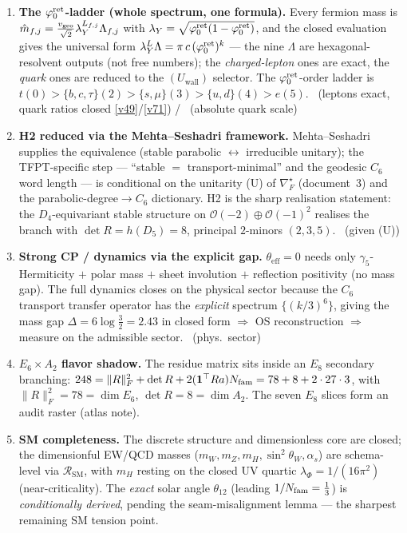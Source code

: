 \begin{enumerate}[leftmargin=1.5em]
\item \textbf{The $\varphi_0^{\mathrm{ret}}$-ladder (whole spectrum, one formula).} Every fermion mass is
  $\hat m_{f,j}=\tfrac{v_{\mathrm{geo}}}{\sqrt2}\lambda_Y^{L_{f,j}}\Lambda_{f,j}$ with
  $\lambda_Y=\sqrt{\varphi_0^{\mathrm{ret}}(1-\varphi_0^{\mathrm{ret}})}$, and the closed evaluation gives the universal form
  $\lambda_Y^{L}\Lambda=\pi\,c\,(\varphi_0^{\mathrm{ret}})^{k}$ --- the nine $\Lambda$ are hexagonal-resolvent outputs (not
  free numbers); the \emph{charged-lepton} ones are exact, the \emph{quark} ones are reduced to the
  $(U_{\mathrm{wall}})$ selector. The $\varphi_0^{\mathrm{ret}}$-order ladder is
  $t(0)>\{b,c,\tau\}(2)>\{s,\mu\}(3)>\{u,d\}(4)>e(5)$. \mE\ (leptons exact, quark ratios closed \vref{v49}/\vref{v71}) / \mO\ (absolute quark scale)

\item \textbf{H2 reduced via the Mehta--Seshadri framework.} Mehta--Seshadri supplies the equivalence
  (stable parabolic $\leftrightarrow$ irreducible unitary); the TFPT-specific step --- ``stable $=$
  transport-minimal'' and the geodesic $C_6$ word length --- is conditional on the unitarity (U) of
  $\nabla_F^\star$ (document~3) and the parabolic-degree$\to C_6$ dictionary. H2 is the sharp realisation
  statement: the $D_4$-equivariant stable structure on $\mathcal O(-2)\oplus\mathcal O(-1)^2$ realises the
  branch with $\det R=h(D_5)=8$, principal $2$-minors $(2,3,5)$. \mE\ (given (U))

\item \textbf{Strong CP / dynamics via the explicit gap.} $\theta_{\mathrm{eff}}=0$ needs only
  $\gamma_5$-Hermiticity $+$ polar mass $+$ sheet involution $+$ reflection positivity (no mass gap).
  The full dynamics closes on the physical sector because the $C_6$ transport transfer operator has the
  \emph{explicit} spectrum $\{(k/3)^6\}$, giving the mass gap $\Delta=6\log\tfrac32=2.43$ in closed form
  $\Rightarrow$ OS reconstruction $\Rightarrow$ measure on the admissible sector. \mE\ (phys.\ sector)

\item \textbf{$E_6\times A_2$ flavor shadow.} The residue matrix sits inside an $E_8$ secondary
  branching: $248=\|R\|_F^2+\det R+2(\mathbf 1^\top R a)N_{\mathrm{fam}}=78+8+2\cdot27\cdot3$, with
  $\|R\|_F^2=78=\dim E_6$, $\det R=8=\dim A_2$. The seven $E_8$ slices form an audit raster (atlas note).
  \mO

\item \textbf{SM completeness.} The discrete structure and dimensionless core are closed; the
  dimensionful EW/QCD masses ($m_W,m_Z,m_H,\sin^2\theta_W,\alpha_s$) are schema-level via $\mathcal R_{\mathrm{SM}}$,
  with $m_H$ resting on the closed UV quartic $\lambda_\Phi=1/(16\pi^2)$ (near-criticality). The
  \emph{exact} solar angle $\theta_{12}$ (leading $1/N_{\mathrm{fam}}=\tfrac13$) is \emph{conditionally derived},
  pending the seam-misalignment lemma --- the sharpest remaining SM tension point. \mC
\end{enumerate}

